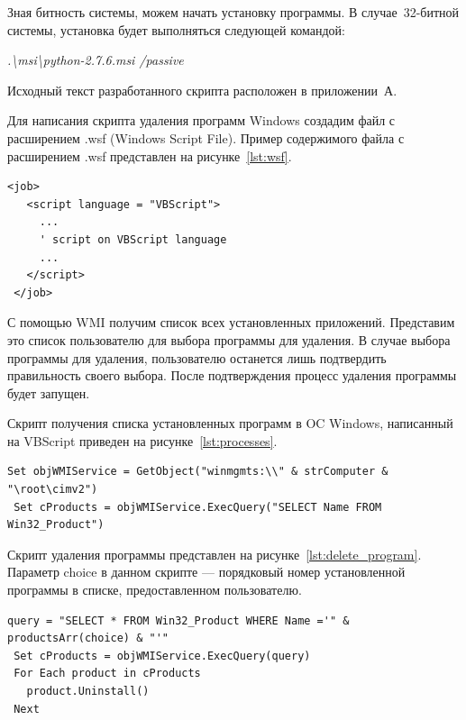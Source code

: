 Зная битность системы, можем начать установку программы. В случае~32-битной
системы, установка будет выполняться следующей командой:

\textit{.\textbackslash msi\textbackslash python-2.7.6.msi /passive}

Исходный текст разработанного скрипта расположен в приложении~А.



Для написания скрипта удаления программ Windows создадим файл
с расширением .wsf (Windows Script File). Пример содержимого файла с расширением
.wsf представлен на рисунке~\ref{lst:wsf}.

\begin{lstlisting}[caption=Пример содержимого файла с расширением .wsf,
label=lst:wsf,basicstyle=\scriptsize\ttfamily,language=VBScript]
 <job>
   <script language = "VBScript">
     ...
     ' script on VBScript language
     ...
   </script>
 </job>
\end{lstlisting}

С помощью WMI получим список всех установленных приложений. Представим это список
пользователю для выбора программы для удаления. В случае выбора программы для
удаления, пользователю останется лишь подтвердить правильность своего выбора.
После подтверждения процесс удаления программы будет запущен.

Скрипт получения списка установленных программ в OC Windows, написанный
на VBScript приведен на рисунке~\ref{lst:processes}.

\begin{lstlisting}[caption=Скрипт получения списка установленных программ \\
на языке VBScript,
label=lst:processes,basicstyle=\scriptsize\ttfamily,language=VBScript]
 Set objWMIService = GetObject("winmgmts:\\" & strComputer & "\root\cimv2")
 Set cProducts = objWMIService.ExecQuery("SELECT Name FROM Win32_Product")
\end{lstlisting}

Скрипт удаления программы представлен на рисунке~\ref{lst:delete_program}.
Параметр choice в данном скрипте --- порядковый номер установленной программы в
списке, предоставленном пользователю.

\begin{lstlisting}[caption=Скрипт удаления выбранной пользователем программы,
label=lst:delete_program,basicstyle=\scriptsize\ttfamily,language=VBScript]
 query = "SELECT * FROM Win32_Product WHERE Name ='" & productsArr(choice) & "'"
 Set cProducts = objWMIService.ExecQuery(query)
 For Each product in cProducts
   product.Uninstall()
 Next
\end{lstlisting}

